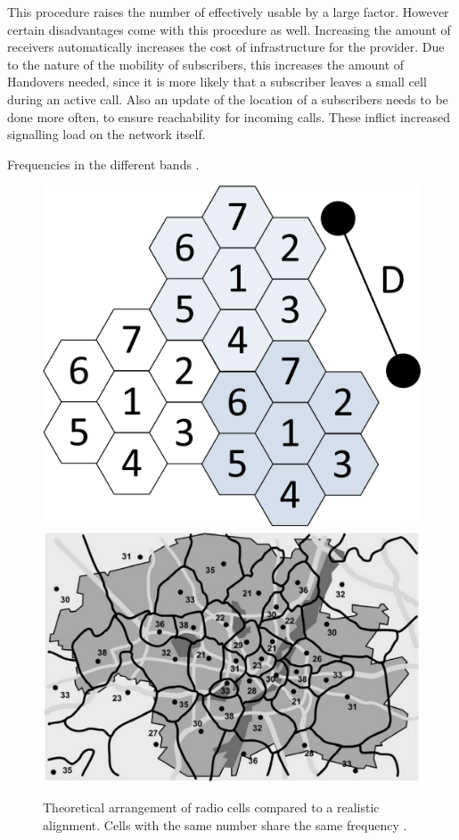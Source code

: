 This procedure raises the number of effectively usable by a large factor.
However certain disadvantages \cite{protocols1999} come with this procedure as well.
Increasing the amount of receivers automatically increases the cost of infrastructure for the provider.
Due to the nature of the mobility of subscribers, this increases the amount of Handovers needed, since it is more likely that a subscriber leaves a small cell during an active call.
Also an update of the location of a subscribers needs to be done more often, to ensure reachability for incoming calls.
These inflict increased signalling load on the network itself.

\begin{table}
\caption{Frequencies in the different bands \cite{kommsys2006}.}
\label{tab:frequencies}
\end{table}

\begin{figure}
\centering
\includegraphics{../Images/Cells}
\hspace{1cm}
\includegraphics[scale=.21]{../Images/real_Cells}
\caption{Theoretical arrangement of radio cells compared to a realistic alignment. Cells with the same number share the same frequency \cite{GSM2009}.}
\label{fig:cells}
\end{figure}

